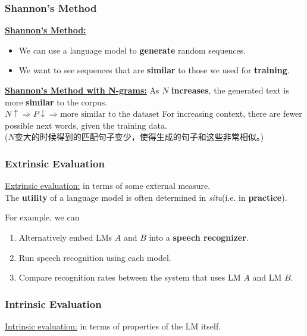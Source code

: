 \documentclass{ainote}
\begin{document}
\subsubsection{Shannon's Method}
\begin{info}
    \textbf{\underline{Shannon's Method:}}
    \begin{itemize}
        \item We can use a language model to \textbf{generate} random sequences.
        \item We want to see sequences that are \textbf{similar} to those we used for \textbf{training}.
    \end{itemize}
\end{info}
\begin{note}
    \textbf{\underline{Shannon's Method with N-grams:}}
    \spskip
    As $N$ \textbf{increases}, the generated text is more \textbf{similar} to the corpus.\\
    $N↑ \Longrightarrow P↓ \Longrightarrow \text{more similar to the dataset}$
    \spskip
    For increasing context, there are fewer possible next words, given the training data.\\
    ($N$变大的时候得到的匹配句子变少，使得生成的句子和这些非常相似。)
\end{note}

\subsubsection{Extrinsic Evaluation}
\underline{Extrinsic evaluation:} in terms of some external measure.\\
The \textbf{utility} of a language model is often determined in \textit{situ}(i.e. in \textbf{practice}).
\spskip
{\small For example, we can
\begin{enumerate}
    \item Alternatively embed LMs $A$ and $B$ into a \textbf{speech recognizer}.
    \item Run speech recognition using each model.
    \item Compare recognition rates between the system that uses LM $A$ and LM $B$.
\end{enumerate}
}
\subsubsection{Intrinsic Evaluation}
\underline{Intrinsic evaluation:} in terms of properties of the LM itself.
\end{document}
